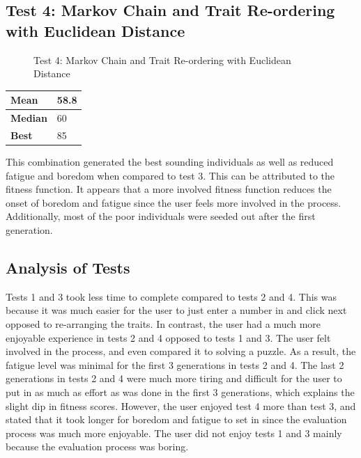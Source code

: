 \documentclass[12pt]{article} %
\begin{document}
\subsection{Test 4: Markov Chain and Trait Re-ordering with Euclidean Distance}
\begin{figure}[H]
\caption{Test 4: Markov Chain and Trait Re-ordering with Euclidean Distance}
\label{fig:test4}
\end{figure}
\begin{center}
	 \label{tab:stats_t4} 
    \begin{tabular}{|l|l|}
        \hline
	\bf{Mean}         & 58.8\\ \hline
	\bf{Median}         & 60 \\ \hline
	\bf{Best} & 85\\ \hline 
    \end{tabular}
\end{center}
This combination generated the best sounding individuals as well as reduced fatigue and boredom when compared to test 3. This can be attributed to the fitness function. It appears that a more involved fitness function reduces the onset of boredom and fatigue since the user feels more involved in the process. Additionally, most of the poor individuals were seeded out after the first generation. \\

\subsection{Analysis of Tests}
Tests 1 and 3 took less time to complete compared to tests 2 and 4. This was because it was much easier for the user to just enter a number in and click next opposed to re-arranging the traits. In contrast, the user had a much more enjoyable experience in tests 2 and 4 opposed to tests 1 and 3. The user felt involved in the process, and even compared it to solving a puzzle. As a result, the fatigue level was minimal for the first 3 generations in tests 2 and 4. The last 2 generations in tests 2 and 4 were much more tiring and difficult for the user to put in as much as effort as was done in the first 3 generations, which explains the slight dip in fitness scores. However, the user enjoyed test 4 more than test 3, and stated that it took longer for boredom and fatigue to set in since the evaluation process was much more enjoyable. The user did not enjoy tests 1 and 3 mainly because the evaluation process was boring.  \\
\end{document}
